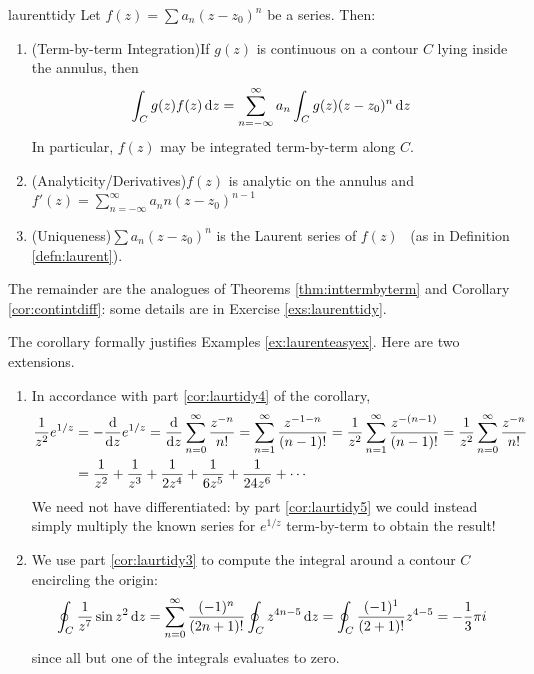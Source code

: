 \begin{cor}{}{laurenttidy}
	Let $f(z)=\sum a_n(z-z_0)^n$ be a series. Then:
	\begin{enumerate}
  	\item\label{cor:laurtidy3} (Term-by-term Integration)\quad If $g(z)$ is continuous on a contour $C$ lying inside the annulus, then
  	\[
  		\int_C g(z)f(z)\,{\mathrm{d} z}=\sum_{n=-\infty}^\infty a_n\int_Cg(z)(z-z_0)^n\,{\mathrm{d} z}
  	\]
  	In particular, $f(z)$ may be integrated term-by-term along $C$.
 
 		\item\label{cor:laurtidy4} (Analyticity/Derivatives)\quad $f(z)$ is analytic on the annulus and $f'(z)=\sum\limits_{n=-\infty}^\infty a_nn(z-z_0)^{n-1}$
  	
  	\item\label{cor:laurtidy5} (Uniqueness)\quad $\sum a_n(z-z_0)^n$ is the Laurent series of $f(z)$ \ (as in Definition \ref{defn:laurent}).
	\end{enumerate}
\end{cor}

 The remainder are the analogues of Theorems \ref{thm:inttermbyterm} and Corollary \ref{cor:contintdiff}: some details are in Exercise \ref{exs:laurenttidy}.


\begin{examples}{}{}
	The corollary formally justifies Examples \ref{ex:laurenteasyex}. Here are two extensions.
	\begin{enumerate}
	  \item In accordance with part \ref*{cor:laurtidy4} of the corollary,
		\begin{align*}
			\frac 1{z^2}e^{1/z}
			&=-\frac{\mathrm{d} }{\mathrm{d} z}e^{1/z}=\frac{\mathrm{d} }{\mathrm{d} z}\sum_{n=0}^\infty\frac{z^{-n}}{n!} 
			=\sum_{n=1}^\infty\frac{z^{-1-n}}{(n-1)!} =\frac 1{z^2}\sum_{n=1}^\infty\frac{z^{-(n-1)}}{(n-1)!} 
			=\frac 1{z^2}\sum_{n=0}^\infty\frac{z^{-n}}{n!}\\
			&=\frac 1{z^2}+\frac 1{z^3}+\frac 1{2z^4}+\frac 1{6z^5}+\frac 1{24z^6}+\cdots
		\end{align*}
		We need not have differentiated: by part \ref*{cor:laurtidy5} we could instead simply multiply the known series for $e^{1/z}$ term-by-term to obtain the result!
		\item We use part \ref*{cor:laurtidy3} to compute the integral around a contour $C$ encircling the origin:
		\[
			\oint_C\frac 1{z^7}\sin z^2\,{\mathrm{d} z} =\sum_{n=0}^\infty\frac{(-1)^n}{(2n+1)!}\oint_Cz^{4n-5}\,{\mathrm{d} z} =\oint_C\frac{(-1)^1}{(2+1)!}z^{4-5} =-\frac 13\pi i
		\]
		since all but one of the integrals evaluates to zero.
	\end{enumerate}
\end{examples}



